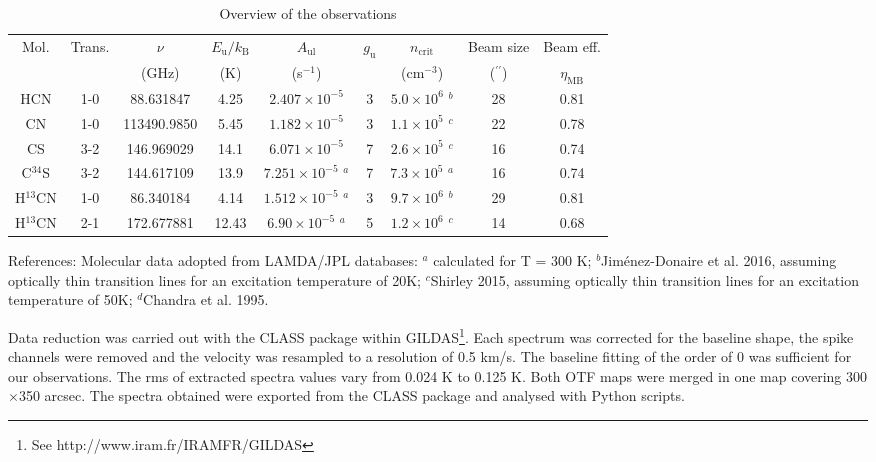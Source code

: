 \documentclass{aa}
\begin{document}
\begin{table*}
\caption{Overview of the observations}             %
\label{table:1}      %
\centering                          %
\begin{tabular}{c c c c c c c c c}        %
\hline\hline                 %
Mol. & Trans. & $\nu$ & $E_\mathrm{u}/k_\mathrm{B}$ &  $A_\mathrm{ul}$ & $g_\mathrm{u}$ & $n_\mathrm{crit}$ &Beam size & Beam eff.\\
 & & (GHz) & (K) & (s$^{-1}$) & & (cm$^{-3}$) & ($^{\prime\prime}$) & $\eta_\mathrm{MB}$\\
\hline                        %
HCN & 1-0 & 88.631847 & 4.25 & $2.407 \times 10^{-5}$  & 3 & $5.0 \times 10^{6}$ $^b$ & 28 & 0.81\\
CN & 1-0 & 113490.9850 & 5.45 & $1.182 \times 10^{-5}$ & 3 & $1.1 \times 10^{5}$ $^c$ & 22 & 0.78\\
CS & 3-2 & 146.969029 & 14.1 & $6.071 \times 10^{-5}$ & 7 &$2.6 \times 10^{5}$ $^c$ & 16 & 0.74\\
C$^{34}$S & 3-2 & 144.617109 & 13.9 & $7.251 \times 10^{-5}$ $^a$ & 7 & $7.3 \times 10^{5}$ $^a$ & 16 & 0.74\\
H$^{13}$CN & 1-0 & 86.340184 & 4.14 & $1.512 \times 10^{-5}$ $^a$ & 3 & $9.7 \times 10^{6}$ $^b$ & 29 & 0.81\\
H$^{13}$CN & 2-1 & 172.677881 & 12.43 & $6.90\times 10^{-5}$ $^a$ & 5 & $1.2 \times 10^{6}$ $^c$ & 14 & 0.68\\
\hline                                   
\end{tabular}
\begin{flushleft}
References: 
Molecular data adopted from LAMDA/JPL databases: $^a$ calculated for T = 300 K;
$^b$Jim\'enez-Donaire et al. 2016, assuming optically thin transition lines for an excitation temperature of 20K;
$^c$Shirley 2015, assuming optically thin transition lines for an excitation temperature of 50K;
$^d$Chandra et al. 1995.
\end{flushleft}
\end{table*}

Data reduction was carried out with the CLASS package within GILDAS\footnote{See http://www.iram.fr/IRAMFR/GILDAS}. Each spectrum was corrected for the baseline shape, the spike channels were removed and the velocity was resampled to a resolution of 0.5 km/s. The baseline fitting of the order of 0 was sufficient for our observations. The rms of extracted spectra values vary from 0.024 K to 0.125 K. Both OTF maps were merged in one map covering 300$\times$350 arcsec. The spectra obtained were exported from the CLASS package and analysed with Python scripts. 
\end{document}
